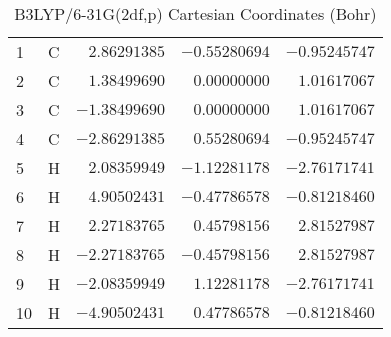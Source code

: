 \documentclass[10pt,oneside]{article}
\begin{document}
\begin{table}[h]
\centering
\caption{B3LYP/6-31G(2df,p) Cartesian Coordinates (Bohr)}
\begin{tabular}{llrrr}
\toprule
1  & C  & $ 2.86291385$ & $-0.55280694$ & $-0.95245747$ \\
2  & C  & $ 1.38499690$ & $ 0.00000000$ & $ 1.01617067$ \\
3  & C  & $-1.38499690$ & $ 0.00000000$ & $ 1.01617067$ \\
4  & C  & $-2.86291385$ & $ 0.55280694$ & $-0.95245747$ \\
5  & H  & $ 2.08359949$ & $-1.12281178$ & $-2.76171741$ \\
6  & H  & $ 4.90502431$ & $-0.47786578$ & $-0.81218460$ \\
7  & H  & $ 2.27183765$ & $ 0.45798156$ & $ 2.81527987$ \\
8  & H  & $-2.27183765$ & $-0.45798156$ & $ 2.81527987$ \\
9  & H  & $-2.08359949$ & $ 1.12281178$ & $-2.76171741$ \\
10 & H  & $-4.90502431$ & $ 0.47786578$ & $-0.81218460$ \\
\bottomrule
\end{tabular}
\end{table}
\end{document}

